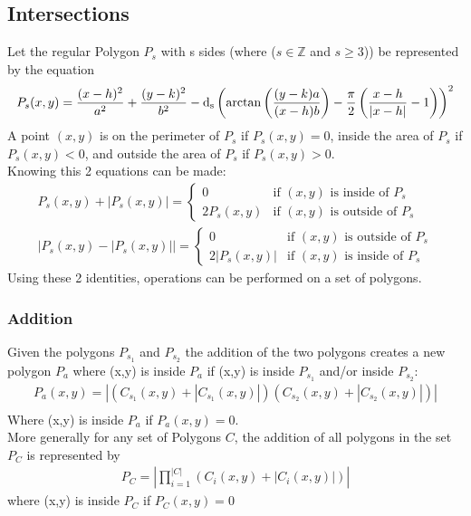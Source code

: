 \documentclass[11pt]{article}
\DeclareMathOperator{\custdsq}{\mathrm{d}_s}
\DeclarePairedDelimiter\abs{\lvert}{\rvert}%
\begin{document}
\subsection{Intersections}
Let the regular Polygon \(P_s\) with s sides (where (\(s\in\mathbb{Z}\) and \(s\geq3\))) be represented by the equation
\begin{gather*}
P_s(x,y)=\frac{(x-h)^2}{a^2}+\frac{(y-k)^2}{b^2}-\custdsq\left(\arctan\left(\frac{(y-k)a}{(x-h)b}\right)-\frac{\pi}{2}\left(\frac{x-h}{\abs{x-h}}-1\right)\right)^2
\end{gather*}
A point \((x,y)\) is on the perimeter of \(P_s\) if \(P_s(x,y)=0\), inside the area of \(P_s\) if \(P_s(x,y)<0\), and outside the area of \(P_s\) if \(P_s(x,y)>0\).\\
Knowing this 2 equations can be made:
\begin{equation*}
\begin{split}
P_s(x,y)+|P_s(x,y)|=\begin{cases}
0 & \text{if } (x,y) \text{ is inside of } P_s \\
2P_s(x,y) & \text{if } (x,y) \text{ is outside of } P_s
\end{cases}\\
|P_s(x,y)-|P_s(x,y)||=\begin{cases}
0 & \text{if } (x,y) \text{ is outside of } P_s \\
2|P_s(x,y)| & \text{if } (x,y) \text{ is inside of } P_s
\end{cases}
\end{split}
\end{equation*}
Using these 2 identities, operations can be performed on a set of polygons.

\subsubsection{Addition}
Given the polygons \(P_{s_1}\) and \(P_{s_2}\) the addition of the two polygons creates a new polygon \(P_a\) where (x,y) is inside \(P_a\) if (x,y) is inside \(P_{s_1}\) and/or inside \(P_{s_2}\):
\begin{gather*}
P_a(x,y)=|(C_{s_1}(x,y)+|C_{s_1}(x,y)|)(C_{s_2}(x,y)+|C_{s_2}(x,y)|)|\\
\end{gather*}
Where (x,y) is inside \(P_a\) if \(P_a(x,y)=0\).\\
More generally for any set of Polygons \(C\), the addition of all polygons in the set \(P_C\) is represented by
\begin{gather*}
P_C=\left| \prod_{i=1}^{|C|}(C_i(x,y)+|C_i(x,y)|)\right|
\end{gather*}
where (x,y) is inside \(P_C\) if \(P_C(x,y)=0\)
\end{document}
